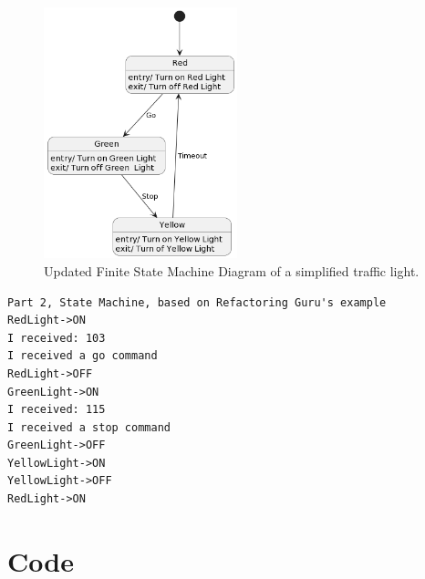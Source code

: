\documentclass{article}
\begin{document}
\begin{figure}[h]
    \centering
    \includegraphics[width=0.5\textwidth]{Assignment3_1StateBehaviour/docs/diagrams/fsm1.png}
    \caption{Updated Finite State Machine Diagram of a simplified traffic light.}
    \label{fig:fsmdiagram}
\end{figure}

\begin{lstlisting}
Part 2, State Machine, based on Refactoring Guru's example
RedLight->ON
I received: 103
I received a go command
RedLight->OFF
GreenLight->ON
I received: 115
I received a stop command
GreenLight->OFF
YellowLight->ON
YellowLight->OFF
RedLight->ON
\end{lstlisting}

\appendix
\section{Code}\label{appendix:code}








\end{document}
